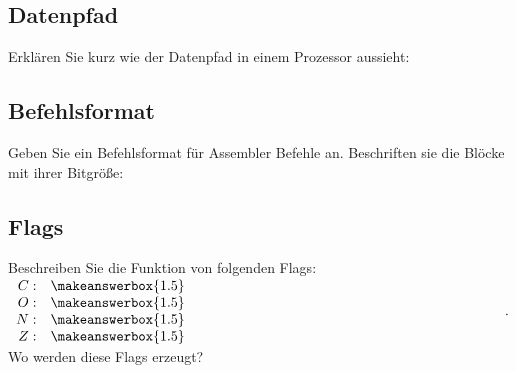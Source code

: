 \subsection{Datenpfad}
Erklären Sie kurz wie der Datenpfad in einem Prozessor aussieht:\\
\subsection{Befehlsformat}
Geben Sie ein Befehlsformat für Assembler Befehle an. Beschriften sie die Blöcke mit ihrer Bitgröße:
\begin{center}
\end{center}
\subsection{Flags}
Beschreiben Sie die Funktion von folgenden Flags:\\
$
\begin{array}{r l}
	C: & \begin{minipage}{0.9\textwidth}
		\makeanswerbox{1.5}
	\end{minipage}\\
	O: & \begin{minipage}{0.93\textwidth}
	\makeanswerbox{1.5}
	\end{minipage}\\
	N: & \begin{minipage}{0.93\textwidth}
	\makeanswerbox{1.5}
	\end{minipage}\\
	Z: & \begin{minipage}{0.93\textwidth}
	\makeanswerbox{1.5}
	\end{minipage}\\
\end{array}.
$\\
Wo werden diese Flags erzeugt?\\
